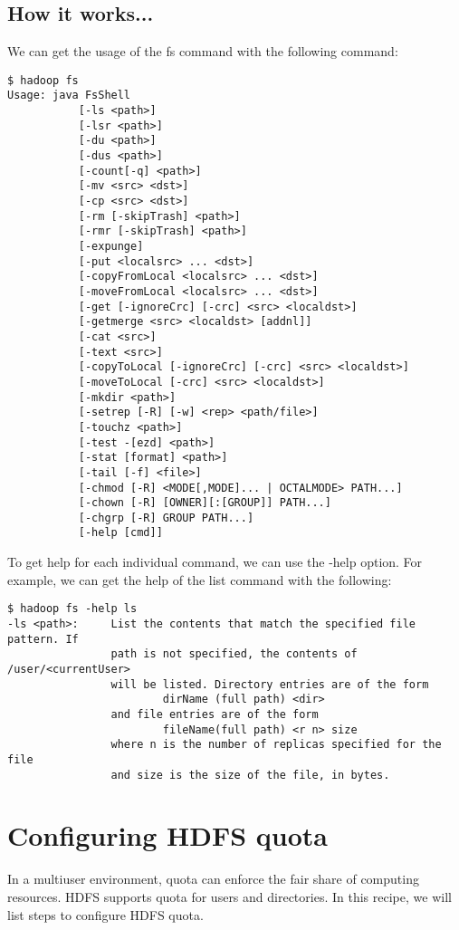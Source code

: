 \subsection*{How it works...}
We can get the usage of the fs command with the following command:
\begin{verbatim}
$ hadoop fs
Usage: java FsShell
           [-ls <path>]
           [-lsr <path>]
           [-du <path>]
           [-dus <path>]
           [-count[-q] <path>]
           [-mv <src> <dst>]
           [-cp <src> <dst>]
           [-rm [-skipTrash] <path>]
           [-rmr [-skipTrash] <path>]
           [-expunge]
           [-put <localsrc> ... <dst>]
           [-copyFromLocal <localsrc> ... <dst>]
           [-moveFromLocal <localsrc> ... <dst>]
           [-get [-ignoreCrc] [-crc] <src> <localdst>]
           [-getmerge <src> <localdst> [addnl]]
           [-cat <src>]
           [-text <src>]
           [-copyToLocal [-ignoreCrc] [-crc] <src> <localdst>]
           [-moveToLocal [-crc] <src> <localdst>]
           [-mkdir <path>]
           [-setrep [-R] [-w] <rep> <path/file>]
           [-touchz <path>]
           [-test -[ezd] <path>]
           [-stat [format] <path>]
           [-tail [-f] <file>]
           [-chmod [-R] <MODE[,MODE]... | OCTALMODE> PATH...]
           [-chown [-R] [OWNER][:[GROUP]] PATH...]
           [-chgrp [-R] GROUP PATH...]
           [-help [cmd]]
\end{verbatim}

To get help for each individual command, we can use the -help option. For example, we can get the help of the list command with the following:
\begin{verbatim}
$ hadoop fs -help ls
-ls <path>:     List the contents that match the specified file pattern. If
                path is not specified, the contents of /user/<currentUser>
                will be listed. Directory entries are of the form
                        dirName (full path) <dir>
                and file entries are of the form
                        fileName(full path) <r n> size
                where n is the number of replicas specified for the file
                and size is the size of the file, in bytes.
\end{verbatim}
\section{Configuring HDFS quota}
In a multiuser environment, quota can enforce the fair share of computing resources. HDFS supports quota for users and directories. In this recipe, we will list steps to configure HDFS quota.

